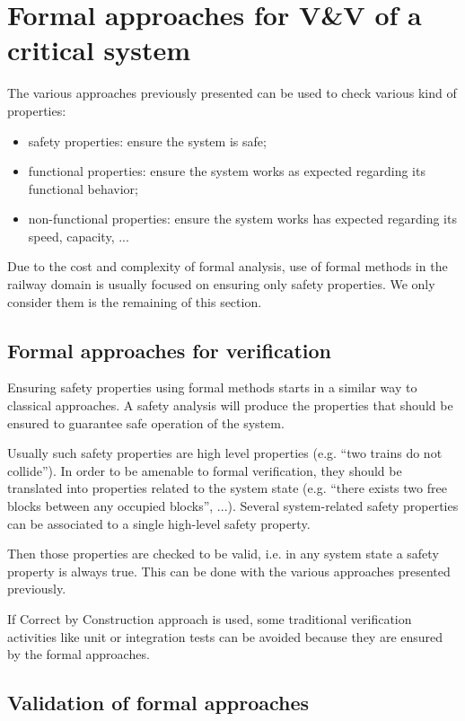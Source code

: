 
\section{Formal approaches for V\&V of a critical system}

The various approaches previously presented can be used to check
various kind of properties:
\begin{itemize}
\item safety properties: ensure the system is safe;
\item functional properties: ensure the system works as expected
  regarding its functional behavior;
\item non-functional properties: ensure the system works has expected
  regarding its speed, capacity, ...
\end{itemize}

Due to the cost and complexity of formal analysis, use of formal
methods in the railway domain is usually focused on ensuring only
safety properties. We only consider them is the remaining of this
section.


\subsection{Formal approaches for verification}

Ensuring safety properties using formal methods starts in a similar
way to classical approaches. A safety analysis will produce the
properties that should be ensured to guarantee safe operation of the
system.

Usually such safety properties are high level properties (e.g. ``two
trains do not collide''). In order to be amenable to formal
verification, they should be translated into properties related to the
system state (e.g. ``there exists two free blocks between any occupied
blocks'', ...). Several system-related safety properties can be
associated to a single high-level safety property.

Then those properties are checked to be valid, i.e. in any system
state a safety property is always true. This can be done with the
various approaches presented previously.

If Correct by Construction approach is used, some traditional
verification activities like unit or integration tests can be avoided
because they are ensured by the formal approaches.

\subsection{Validation of formal approaches}

